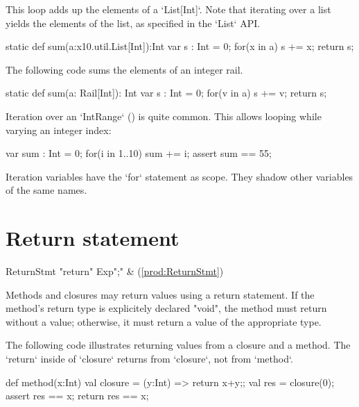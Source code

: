 \begin{ex}
This loop adds up the elements of a \xcd`List[Int]`.
Note that iterating over a list yields the elements of the list, as specified
in the \xcd`List` API. 
\begin{xten}
static def sum(a:x10.util.List[Int]):Int {
  var s : Int = 0;
  for(x in a) s += x;
  return s;
}
\end{xten}

The following code sums the elements of an integer rail. 
\begin{xten}
static def sum(a: Rail[Int]): Int {
  var s : Int = 0;
  for(v in a) s += v;
  return s;
}
\end{xten}

Iteration over an \xcd`IntRange` () is quite common. This
allows looping while varying an integer index: 
\begin{xten}
var sum : Int = 0;
for(i in 1..10) sum += i;
assert sum == 55;
\end{xten}


\end{ex}

Iteration variables have the \xcd`for` statement as scope.  They shadow other
variables of the same names.


\section{Return statement}
\label{ReturnStatement}

\begin{bbgrammar}
          ReturnStmt \: \xcd"return" Exp\opt \xcd";" & (\ref{prod:ReturnStmt}) \\
\end{bbgrammar}

Methods and closures may return values using a return statement.
If the method's return type is explicitely declared \xcd"void",
the method must return without a value; otherwise, it must return
a value of the appropriate type.

\begin{ex}
The following code illustrates returning values from a closure and a method.
The \xcd`return` inside of \xcd`closure` returns from \xcd`closure`, not from
\xcd`method`.  
\begin{xten}
def method(x:Int) {
  val closure = (y:Int) => {return x+y;}; 
  val res = closure(0);
  assert res == x;
  return res == x;
}
\end{xten}


\end{ex}


